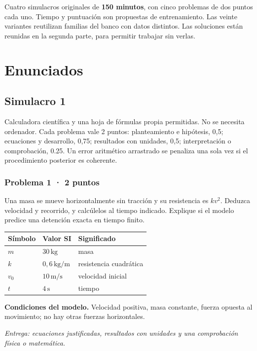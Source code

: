 \noindent Cuatro simulacros originales de \textbf{150 minutos}, con cinco problemas de dos puntos cada uno. Tiempo y puntuación son propuestas de entrenamiento. Las veinte variantes reutilizan familias del banco con datos distintos. Las soluciones están reunidas en la segunda parte, para permitir trabajar sin verlas.
\tableofcontents
\mainmatter
\part{Enunciados}


\chapter{Simulacro 1}


Calculadora científica y una hoja de fórmulas propia permitidas. No se necesita ordenador. Cada problema vale 2 puntos: planteamiento e hipótesis, 0,5; ecuaciones y desarrollo, 0,75; resultados con unidades, 0,5; interpretación o comprobación, 0.25. Un error aritmético arrastrado se penaliza una sola vez si el procedimiento posterior es coherente.


\par\medskip\noindent\begin{minipage}{\linewidth}

\section{Problema 1 · 2 puntos}

Una masa se mueve horizontalmente sin tracción y su resistencia es $k v^2$. Deduzca velocidad y recorrido, y calcúlelos al tiempo indicado. Explique si el modelo predice una detención exacta en tiempo finito.

\begin{tabular}{@{}p{.15\linewidth}p{.23\linewidth}p{.54\linewidth}@{}}
\toprule Símbolo & Valor SI & Significado\\\midrule
$m$ & $30\,\mathrm{kg}$ & masa\\
$k$ & $0{,}6\,\mathrm{kg/m}$ & resistencia cuadrática\\
$v_0$ & $10\,\mathrm{m/s}$ & velocidad inicial\\
$t$ & $4\,\mathrm{s}$ & tiempo\\
\bottomrule\end{tabular}

\par\medskip\textbf{Condiciones del modelo.} Velocidad positiva, masa constante, fuerza opuesta al movimiento; no hay otras fuerzas horizontales.

\par\textit{Entrega: ecuaciones justificadas, resultados con unidades y una comprobación física o matemática.}

\end{minipage}\par\medskip

